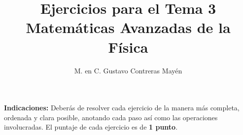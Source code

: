 
\title{Ejercicios para el Tema 3 \\[0.3em]  \large{Matemáticas Avanzadas de la Física}\vspace{-3ex}}
\author{M. en C. Gustavo Contreras Mayén}
\date{ }

\vspace{-4cm}
\maketitle
\fontsize{14}{14}\selectfont

\textbf{Indicaciones: } Deberás de resolver cada ejercicio de la manera más completa, ordenada y clara posible, anotando cada paso así como las operaciones involucradas. El puntaje de cada ejercicio es de \textbf{1 punto}.

